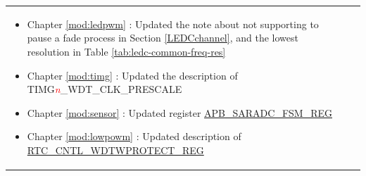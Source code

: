 \begin{longtable}[l]{ | m{2cm} | m{1.5cm} | m{12cm} | }
\begin{itemize}
        \item Chapter \ref{mod:ledpwm} \textit{\nameref{mod:ledpwm}}: Updated the note about not supporting to pause a fade process in Section \ref{LEDCchannel}, and the lowest resolution in Table \ref{tab:ledc-common-freq-res} %

        \item Chapter \ref{mod:timg} \textit{\nameref{mod:timg}}: Updated the description of TIMG\textcolor{red}{\it{n}}\_WDT\_CLK\_PRESCALE %

        \item Chapter \ref{mod:sensor} \textit{\nameref{mod:sensor}}: Updated register \hyperlink{regdesc:APBSARADCFSMREG}{APB\_SARADC\_FSM\_REG} %

        \item Chapter \ref{mod:lowpowm} \textit{\nameref{mod:lowpowm}}: Updated description of \hyperref[regdesc:RTCCNTLWDTWPROTECTREG]{RTC\_CNTL\_WDTWPROTECT\_REG} %


\end{itemize}
\end{longtable}
